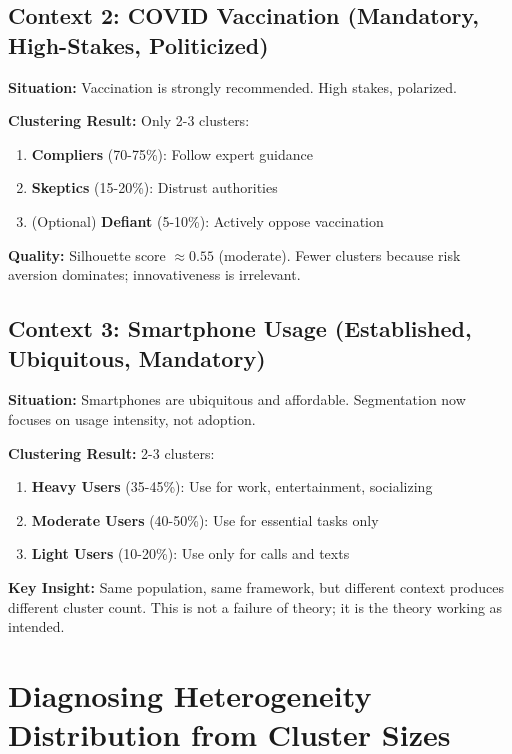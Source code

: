 \subsection{Context 2: COVID Vaccination (Mandatory, High-Stakes, Politicized)}

\textbf{Situation:} Vaccination is strongly recommended. High stakes, polarized.

\textbf{Clustering Result:} Only 2-3 clusters:
\begin{enumerate}
    \item \textbf{Compliers} (70-75\%): Follow expert guidance
    \item \textbf{Skeptics} (15-20\%): Distrust authorities
    \item (Optional) \textbf{Defiant} (5-10\%): Actively oppose vaccination
\end{enumerate}

\textbf{Quality:} Silhouette score $\approx 0.55$ (moderate). Fewer clusters because
risk aversion dominates; innovativeness is irrelevant.

\subsection{Context 3: Smartphone Usage (Established, Ubiquitous, Mandatory)}

\textbf{Situation:} Smartphones are ubiquitous and affordable. Segmentation now focuses
on usage intensity, not adoption.

\textbf{Clustering Result:} 2-3 clusters:
\begin{enumerate}
    \item \textbf{Heavy Users} (35-45\%): Use for work, entertainment, socializing
    \item \textbf{Moderate Users} (40-50\%): Use for essential tasks only
    \item \textbf{Light Users} (10-20\%): Use only for calls and texts
\end{enumerate}

\textbf{Key Insight:} Same population, same framework, but different context produces
different cluster count. This is not a failure of theory; it is the theory working as intended.

\section{Diagnosing Heterogeneity Distribution from Cluster Sizes}
\label{sec:cluster-size-diagnosis}

